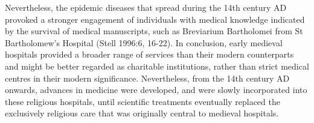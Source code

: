 \documentclass[%
	]{ijsra}
\begin{document}
Nevertheless, the epidemic diseases that spread during the 14th century AD provoked a stronger engagement of individuals with medical knowledge indicated by the survival of medical manuscripts, such as Breviarium Bartholomei from St Bartholomew’s Hospital (Stell 1996:6, 16-22). 
In conclusion, early medieval hospitals provided a broader range of services than their modern counterparts and might be better regarded as charitable institutions, rather than strict medical centres in their modern significance. Nevertheless, from the 14th century AD onwards, advances in medicine were developed, and were slowly incorporated into these religious hospitals, until scientific treatments eventually replaced the exclusively religious care that was originally central to medieval hospitals. 

\IJSRAclosing%
\end{document}
